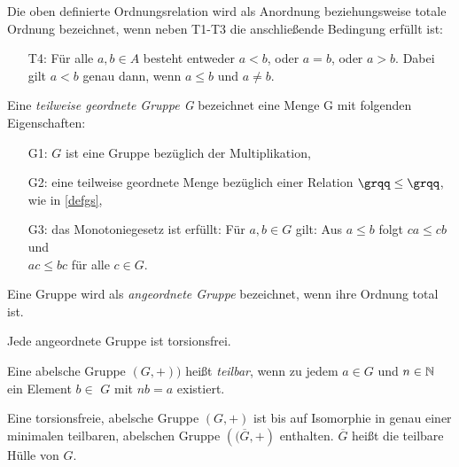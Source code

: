 Die oben definierte Ordnungsrelation wird als Anordnung beziehungsweise totale Ordnung bezeichnet, wenn neben T1-T3 die anschließende Bedingung erfüllt ist:
%
\begin{enumerate}
\item[T4:] Für alle $a, b \in A$ besteht entweder $a < b$, oder $a = b$, oder $a > b$. Dabei gilt $a < b$ genau dann, wenn $a \leq b$ und $a\neq b$. 
\end{enumerate}
%
%
\begin{defn}\label{twgG} %
Eine \textit{teilweise geordnete Gruppe G} bezeichnet eine Menge G mit folgenden Eigenschaften: 
%
\begin{enumerate}
\item[G1:] $G$ ist eine Gruppe bezüglich der Multiplikation,
\item[G2:] eine teilweise geordnete Menge bezüglich einer Relation $ \grqq\leq\grqq $, wie in \ref{defgs}, 
\item[G3:] das Monotoniegesetz ist erfüllt: Für $a, b \in  G$ gilt: Aus $a \leq b$ folgt $ca \leq  cb$ und \\ $ac \leq bc$ für alle $c \in G$.
\end{enumerate}
% 
\end{defn}
%
%
\begin{defn}\label{agG}
Eine Gruppe wird als \textit{angeordnete Gruppe} bezeichnet, wenn ihre Ordnung total ist.
\end{defn}
%
\begin{satz} \label{angeordnetFolgtTorsionsfrei} %
Jede angeordnete Gruppe ist torsionsfrei. 
\end{satz}
%
%
\begin{defn} %
Eine abelsche Gruppe $\left(G, +\right))$ heißt \textit{teilbar}, wenn zu jedem $a\in G$ und $n \in \mathbb{N}$ ein Element $b \in$ $G$ mit $nb = a$ existiert.
\end{defn}
\begin{satz}\label{torsionsfreiHülle} %
Eine torsionsfreie, abelsche Gruppe $\left(G, +\right)$ ist bis auf Isomorphie in genau einer minimalen teilbaren, abelschen Gruppe $\left((\overline{G}, +\right)$ enthalten. $\overline{G}$ heißt die teilbare Hülle von $G$. 
\end{satz}
